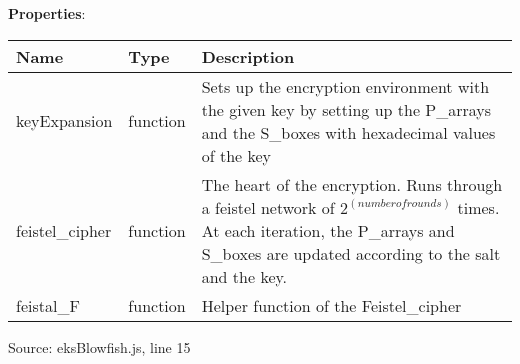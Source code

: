\documentclass[12pt]{article}
\begin{document}
\noindent\textbf{Properties}:

\begin{table}[H]
\centering
\label{tab:table6}
      \begin{tabular}{ | p{4cm} | p{4cm} | p{9cm} | }
        \hline
            \textbf{Name} & \textbf{Type} & \textbf{Description} \\
        \hline
          keyExpansion & function & Sets up the encryption environment with the given key by setting up the P\_arrays and the S\_boxes with hexadecimal values of the key  \\
        \hline
          feistel\_cipher & function & The heart of the encryption. Runs through a feistel network of $2^(number of rounds)$ times. At each iteration, the P\_arrays and S\_boxes are updated according to the salt and the key.  \\
        \hline
          feistal\_F & function & Helper function of the Feistel\_cipher \\
       \hline
      \end{tabular}
Source: eksBlowfish.js, line 15
  \end{table}
\end{document}
